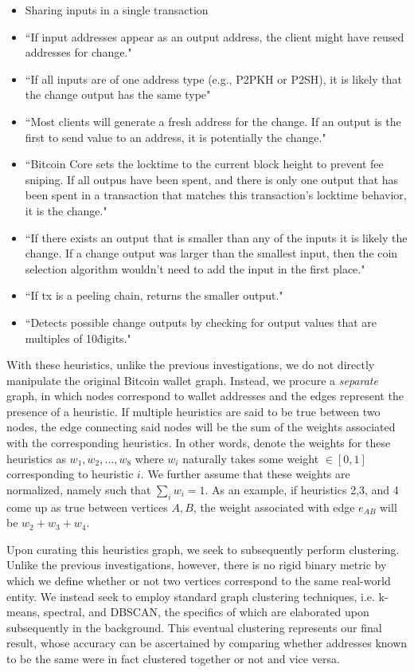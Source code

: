 \documentclass[journal]{IEEEtran}
\begin{document}
\begin{itemize}
    \item Sharing inputs in a single transaction
    \item ``If input addresses appear as an output address, the client might have reused addresses for change."
    \item ``If all inputs are of one address type (e.g., P2PKH or P2SH), it is likely that the change output has the same type"
    \item ``Most clients will generate a fresh address for the change. If an output is the first to send value to an address, it is potentially the change."
    \item ``Bitcoin Core sets the locktime to the current block height to prevent fee sniping. If all outpus have been spent, and there is only one output that has been spent in a transaction that matches this transaction’s locktime behavior, it is the change."
    \item ``If there exists an output that is smaller than any of the inputs it is likely the change. If a change output was larger than the smallest input, then the coin selection algorithm wouldn’t need to add the input in the first place."
    \item ``If tx is a peeling chain, returns the smaller output."
    \item ``Detects possible change outputs by checking for output values that are multiples of 10\^digits."
\end{itemize}

With these heuristics, unlike the previous investigations, we do not directly manipulate the original Bitcoin wallet graph. Instead, we procure a \textit{separate} graph, in which nodes correspond to wallet addresses and the edges represent the presence of a heuristic. If multiple heuristics are said to be true between two nodes, the edge connecting said nodes will be the sum of the weights associated with the corresponding heuristics. In other words, denote the weights for these heuristics as $w_1, w_2, ..., w_8$ where $w_i$ naturally takes some weight $\in[0,1]$ corresponding to heuristic $i$. We further assume that these weights are normalized, namely such that $\sum_i w_i = 1$. As an example, if heuristics 2,3, and 4 come up as true between vertices $A,B$, the weight associated with edge $e_{AB}$ will be $w_2+w_3+w_4$.

Upon curating this heuristics graph, we seek to subsequently perform clustering. Unlike the previous investigations, however, there is no rigid binary metric by which we define whether or not two vertices correspond to the same real-world entity. We instead seek to employ standard graph clustering techniques, i.e. k-means, spectral, and DBSCAN, the specifics of which are elaborated upon subsequently in the background. This eventual clustering represents our final result, whose accuracy can be ascertained by comparing whether addresses known to be the same were in fact clustered together or not and vice versa.
\end{document}
